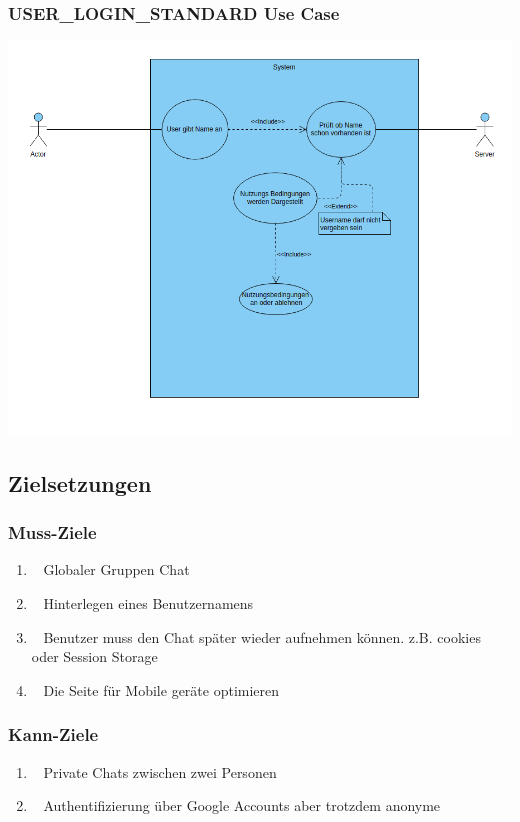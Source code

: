 \documentclass[12pt]{article}
\begin{document}
      \subsubsection{USER\_LOGIN\_STANDARD Use Case}
        \includegraphics[width=\textwidth]{useCase_USER_LOGIN_STANDARD.png}

    \subsection{Zielsetzungen}
      \subsubsection{Muss-Ziele}
        \begin{enumerate}
          \item \faGlobe~   Globaler Gruppen Chat
          \item \faUser~    Hinterlegen eines Benutzernamens
          \item \faKey~     Benutzer muss den Chat später wieder aufnehmen können. z.B. cookies oder Session Storage
          \item \faMobile~  Die Seite für Mobile geräte optimieren
        \end{enumerate}

      \subsubsection{Kann-Ziele}
        \begin{enumerate}
          \item \faUsers~   Private Chats zwischen zwei Personen
          \item \faGoogle~  Authentifizierung über Google Accounts aber trotzdem anonyme
        \end{enumerate}
\end{document}
